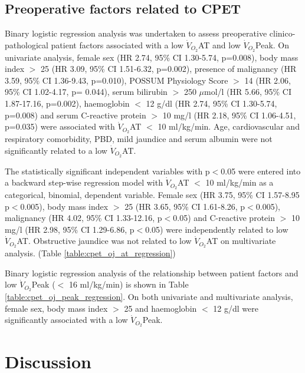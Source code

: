 \begin{figure}[htbp]
	
\end{figure}

\subsection{Preoperative factors related to CPET}
Binary logistic regression analysis was undertaken to assess preoperative clinico-pathological patient factors associated with a low $\dot{V}_{O_2}$AT and low $\dot{V}_{O_2}$Peak. 
On univariate analysis, female sex (HR 2.74, 95\% CI 1.30-5.74, p=0.008), body mass index $>$ 25 (HR 3.09, 95\% CI 1.51-6.32, p=0.002), presence of malignancy (HR 3.59, 95\% CI 1.36-9.43, p=0.010), POSSUM Physiology Score $>$ 14 (HR 2.06, 95\% CI 1.02-4.17, p= 0.044), serum bilirubin $>$ 250 $\mu$mol/l (HR 5.66, 95\% CI 1.87-17.16, p=0.002), haemoglobin $<$ 12 g/dl (HR 2.74, 95\% CI 1.30-5.74, p=0.008) and serum C-reactive protein $>$ 10 mg/l (HR 2.18, 95\% CI 1.06-4.51, p=0.035) were associated with $\dot{V}_{O_2}$AT $<$ 10 ml/kg/min. 
Age, cardiovascular and respiratory comorbidity, PBD, mild jaundice and serum albumin were not significantly related to a low $\dot{V}_{O_2}$AT. 

The statistically significant independent variables with p$<$0.05 were entered into a backward step-wise regression model with $\dot{V}_{O_2}$AT $<$ 10 ml/kg/min as a categorical, binomial, dependent variable. 
Female sex (HR 3.75, 95\% CI 1.57-8.95 p$<$0.005), body mass index $>$ 25 (HR 3.65, 95\% CI 1.61-8.26, p$<$0.005), malignancy (HR 4.02, 95\% CI 1.33-12.16, p$<$0.05) and C-reactive protein $>$ 10 mg/l (HR 2.98, 95\% CI 1.29-6.86, p$<$0.05) were independently related to low $\dot{V}_{O_2}$AT. 
Obstructive jaundice was not related to low $\dot{V}_{O_2}$AT on multivariate analysis. (Table \ref{table:cpet_oj_at_regression})

Binary logistic regression analysis of the relationship between patient factors and low $\dot{V}_{O_2}$Peak ($<$ 16 ml/kg/min) is shown in Table \ref{table:cpet_oj_peak_regression}. 
On both univariate and multivariate analysis, female sex, body mass index $>$ 25 and haemoglobin $<$ 12 g/dl were significantly associated with a low $\dot{V}_{O_2}$Peak. 




\clearpage

\section{Discussion}

